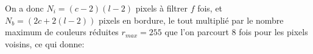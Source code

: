 \documentclass[a4paper, 11pt]{article}
\begin{document}
On a donc $N_i = (c - 2)(l-2)$ pixels à filtrer $f$ fois, et $N_b = (2c + 2(l-2))$ pixels en bordure, le tout multiplié par le nombre maximum de couleurs réduites $r_{max} = 255$ que l'on parcourt 8 fois pour les pixels voisins, ce qui donne:

\end{document}

